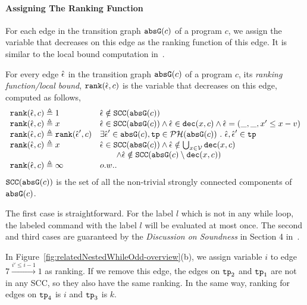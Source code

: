  \paragraph{Assigning The Ranking Function}
 For each edge in the transition graph $\mathtt{abs}{\mathtt{G}}(c)$ of a program $c$,
 we assign the variable that decreases on this edge as the ranking function of this edge.
 It is similar to the local bound computation in~\cite{SinnZV17}.
 \begin{defn}
    \label{def:ranking_gen}
    For every edge $\hat{\mathtt{\epsilon}{}}$ in the transition graph $\mathtt{abs}{\mathtt{G}}(c)$ of a program $c$,
    its \emph{ranking function/local bound}, $\mathtt{rank}(\hat{\mathtt{\epsilon}{}}, c)$
    is the variable that decreases on this edge, computed as follows,
    \[ 
   \begin{array}{ll}
    \mathtt{rank}(\hat{\mathtt{\epsilon}{}}, c) \triangleq 1 
    & \hat{\mathtt{\epsilon}{}} \notin \mathtt{SCC}(\mathtt{abs}{\mathtt{G}}(c))
    \\
    \mathtt{rank}(\hat{\mathtt{\epsilon}{}}, c) \triangleq x
    & \hat{\mathtt{\epsilon}{}} \in \mathtt{SCC}(\mathtt{abs}{\mathtt{G}}(c)) \land \hat{\mathtt{\epsilon}{}} \in \mathtt{dec}(x, c) \land \hat{\mathtt{\epsilon}{}} = (\_, \_ , x' \leq x - v) \\
    \mathtt{rank}(\hat{\mathtt{\epsilon}{}}, c) \triangleq \mathtt{rank}(\hat{\mathtt{\epsilon}{}}', c)
    & \exists \hat{\mathtt{\epsilon}{}}' \in \mathtt{abs}{\mathtt{G}}(c), \mathtt{tp} \in \mathcal{PH}( \mathtt{abs}{\mathtt{G}}(c)) ~.~ \hat{\mathtt{\epsilon}{}}, \hat{\mathtt{\epsilon}{}}' \in \mathtt{tp} \\
    \mathtt{rank}(\hat{\mathtt{\epsilon}{}}, c) \triangleq x
    & \hat{\mathtt{\epsilon}{}} \in \mathtt{SCC}(\mathtt{abs}{\mathtt{G}}(c)) \land 
    \hat{\mathtt{\epsilon}{}} \notin \bigcup_{x \in \mathcal{V}} \mathtt{dec}(x, c) \\
    & \qquad \land \hat{\mathtt{\epsilon}{}} \notin \mathtt{SCC}(\mathtt{abs}{\mathtt{G}}(c) \setminus \mathtt{dec}(x, c))\\
    \mathtt{rank}(\hat{\mathtt{\epsilon}{}}, c) \triangleq \infty
    & o.w..
   \end{array}
   \]
    $\mathtt{SCC}(\mathtt{abs}{\mathtt{G}}(c))$ is the set of all the non-trivial strongly connected components of $\mathtt{abs}{\mathtt{G}}(c)$.
    \end{defn}
    The first case is straightforward. 
    For the label $l$ which is not in any while loop, 
    the labeled command with the label $l$ will be 
    evaluated at most once. 
    The second and third cases are guaranteed by the \emph{Discussion on Soundness} in Section 4 in~\cite{SinnZV17}.
   
 In Figure~\ref{fig:relatedNestedWhileOdd-overview}(b), we assign variable $i$ to edge $7 \xrightarrow{i' \leq i - 1} 1$ as ranking.
 If we remove this edge, the edges on $\mathtt{tp}_2$ and $\mathtt{tp}_1$ are not in any SCC, so they also have the same ranking.
In the same way, ranking for edges on $\mathtt{tp}_4$ is $i$ and $\mathtt{tp}_3$ is $k$.


